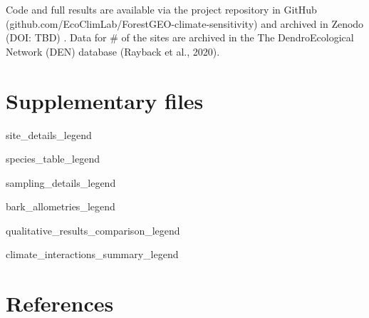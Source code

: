 \documentclass[
]{article}
\begin{document}
Code and full results are available via the project repository in GitHub
(github.com/EcoClimLab/ForestGEO-climate-sensitivity) and archived in
Zenodo (DOI: TBD) . Data for \# of the sites are archived in the The
DendroEcological Network (DEN) database (Rayback et al., 2020).

\hypertarget{supplementary-files}{%
\section{Supplementary files}\label{supplementary-files}}

site\_details\_legend

species\_table\_legend

sampling\_details\_legend

bark\_allometries\_legend

qualitative\_results\_comparison\_legend

climate\_interactions\_summary\_legend

\hypertarget{references}{%
\section*{References}\label{references}}
\end{document}
